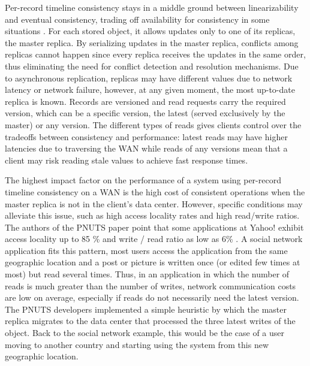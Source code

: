 \documentclass[doublespacing]{bmcart}
\begin{document}
Per-record timeline consistency stays in a middle ground between
linearizability \cite{Herlihy1990} and eventual consistency, trading off
availability for consistency in some situations \cite{Cooper2008}. For each
stored object, it allows updates only to one of its replicas, the master
replica. By serializing updates in the master replica, conflicts among replicas
cannot happen since every replica receives the updates in the same order, thus
eliminating the need for conflict detection and resolution mechanisms. Due to
asynchronous replication, replicas may have different values due to network
latency or network failure, however, at any given moment, the most up-to-date
replica is known. Records are versioned and read requests carry the required
version, which can be a specific version, the latest (served exclusively by the
master) or any version. The different types of reads gives clients control over
the tradeoffs between consistency and performance: latest reads may have higher
latencies due to traversing the WAN while reads of any versions mean that a
client may risk reading stale values to achieve fast response times.

The highest impact factor on the performance of a system using per-record
timeline consistency on a WAN is the high cost of consistent operations when
the master replica is not in the client's data center. However, specific
conditions may alleviate this issue, such as high access locality rates and
high read/write ratios. The authors of the PNUTS paper point that some
applications at Yahoo! exhibit access locality up to 85 \% and write / read
ratio as low as 6\% \cite{Kadambi2011, Cooper2008}. A social network
application fits this pattern, most users access the application from the same
geographic location and a post or picture is written once (or edited few times
at most) but read several times. Thus, in an application in which the number of
reads is much greater than the number of writes, network communication costs
are low on average, especially if reads do not necessarily need the latest
version. The PNUTS developers implemented a simple heuristic by which the
master replica migrates to the data center that processed the three latest
writes of the object. Back to the social network example, this would be the
case of a user moving to another country and starting using the system from
this new geographic location.
\end{document}

